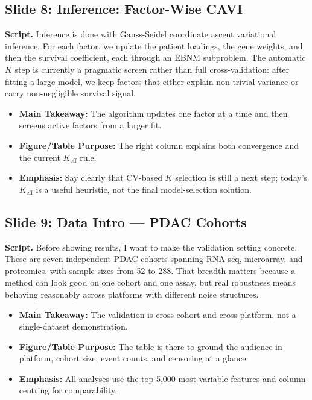 \documentclass[11pt]{article}
\newcommand{\sectionlabel}[1]{\textbf{#1}}
\begin{document}
\subsection*{Slide 8: Inference: Factor-Wise CAVI}
\textbf{Script.} Inference is done with Gauss-Seidel coordinate ascent variational inference. For each factor, we update the patient loadings, the gene weights, and then the survival coefficient, each through an EBNM subproblem. The automatic $K$ step is currently a pragmatic screen rather than full cross-validation: after fitting a large model, we keep factors that either explain non-trivial variance or carry non-negligible survival signal.

\begin{itemize}
\item \sectionlabel{Main Takeaway:} The algorithm updates one factor at a time and then screens active factors from a larger fit.
\item \sectionlabel{Figure/Table Purpose:} The right column explains both convergence and the current $K_{\text{eff}}$ rule.
\item \sectionlabel{Emphasis:} Say clearly that CV-based $K$ selection is still a next step; today’s $K_{\text{eff}}$ is a useful heuristic, not the final model-selection solution.
\end{itemize}

\subsection*{Slide 9: Data Intro --- PDAC Cohorts}
\textbf{Script.} Before showing results, I want to make the validation setting concrete. These are seven independent PDAC cohorts spanning RNA-seq, microarray, and proteomics, with sample sizes from 52 to 288. That breadth matters because a method can look good on one cohort and one assay, but real robustness means behaving reasonably across platforms with different noise structures.

\begin{itemize}
\item \sectionlabel{Main Takeaway:} The validation is cross-cohort and cross-platform, not a single-dataset demonstration.
\item \sectionlabel{Figure/Table Purpose:} The table is there to ground the audience in platform, cohort size, event counts, and censoring at a glance.
\item \sectionlabel{Emphasis:} All analyses use the top 5,000 most-variable features and column centring for comparability.
\end{itemize}
\end{document}
